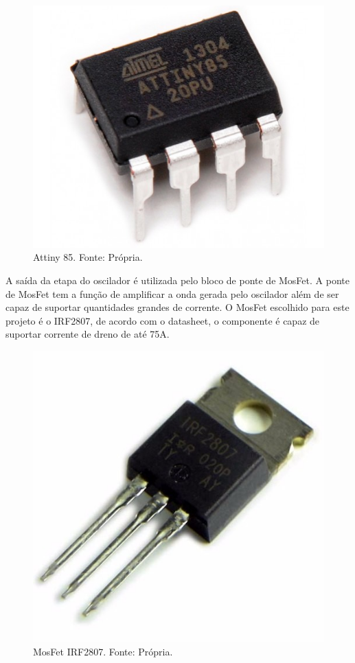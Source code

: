         \begin{figure}[!htb]
            \centering
            \includegraphics[scale= 0.2]{figuras/Attiny.jpg}
            \caption{Attiny 85. Fonte: Própria.}
            \label{attiny}
        \end{figure} 	
        
        A saída da etapa do oscilador é utilizada pelo bloco de ponte de MosFet. A 						ponte de MosFet tem a função de amplificar a onda gerada pelo oscilador além 					de ser capaz de suportar quantidades grandes de corrente. O MosFet escolhido 					para este projeto é o IRF2807, de acordo com o datasheet, o componente é capaz 				de suportar corrente de dreno de até 75A.	
        
        \begin{figure}[!htb]
            \centering
            \includegraphics[scale= 0.2]{figuras/IRF2807.jpg}
            \caption{MosFet IRF2807. Fonte: Própria.}
            \label{mosfet}
        \end{figure}            						
        
